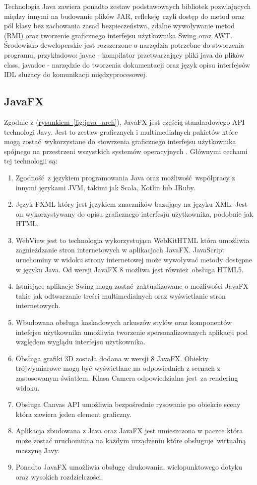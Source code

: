 Technologia Java zawiera ponadto zestaw podstawowaych bibliotek pozwlających między innymi na budowanie plików JAR, refleksję czyli dostęp do metod oraz pól klasy bez zachowania zasad bezpieczeństwa, zdalne wywoływanie metod (RMI) oraz tworzenie graficznego interfejsu użytkownika Swing oraz AWT. Środowisko deweloperskie jest rozszerzone o narzędzia potrzebne do stworzenia programu, przykładowo: javac - kompilator przetwarzający pliki java do plików class, javadoc - narzędzie do tworzenia dokumentacji oraz język opisu interfejsów IDL służacy do komunikacji międzyprocesowej.
\subsection{JavaFX}
Zgodnie z (\hyperref[fig:java_arch]{rysunkiem~\ref*{fig:java_arch}}), JavaFX jest częścią standardowego API technologi Javy. Jest to zestaw graficznych i multimedialnych pakietów które mogą zostać wykorzystane do stowrzenia graficznego interfejsu użytkownika spójnego na przestrzeni wszystkich systemów operacyjnych \cite{JavaFxInfo}. Głównymi cechami tej technologii są:
\begin{enumerate}
  \item Zgodność z językiem programowania Java oraz możliwość współpracy z innymi językami JVM, takimi jak Scala, Kotlin lub JRuby.
  \item Język FXML który jest językiem znaczników bazujący na języku XML. Jest on wykorzystywany do opisu graficznego interfesju użytkownika, podobnie jak HTML.
  \item WebView jest to technologia wykorzystująca WebKitHTML która umożliwia zagnieżdzanie stron internetowych w aplikacjach JavaFX. JavaScript uruchominy w widoku strony internetowej może wywoływać metody dostępne w języku Java. Od wersji JavaFX 8 możliwa jest również obsługa HTML5.
  \item Istniejące aplikacje Swing mogą zostać zaktualizowane o możliwości JavaFX takie jak odtwarzanie treści multimedialnych oraz wyświetlanie stron internetowych.
  \item Wbudowana obsługa kaskadowych arkuszów stylów oraz komponentów intefejsu użytkownika umożliwia tworzenie spersonalizowanych aplikacji pod względem wyglądu interfejsu użytkownika.
  \item Obsługa grafiki 3D została dodana w wersji 8 JavaFX. Obiekty trójwymiarowe mogą być wyświetlane na odpowiednich z scenach z zastosowanym światłem. Klasa Camera odpowiedzialna jest za rendering widoku.
  \item Obsługa Canvas API umożliwia bezpośrednie rysowanie po obiekcie sceny która zawiera jeden element graficzny.
  \item Aplikacja zbudowana z Java oraz JavaFX jest umieszczona w paczce która może zostać uruchomiana na każdym urządzeniu które obsługuje wirtualną maszynę Javy.
  \item Ponadto JavaFX umożliwia obsługę drukowania, wielopunktowego dotyku oraz  wysokich rozdzielczości.
\end{enumerate}

